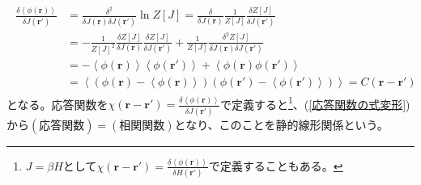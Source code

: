 \documentclass[a4paper,12pt, oneside, openany]{jsbook}
\begin{document}
\begin{eqnarray}
  \label{応答関数の式変形}
  \begin{split}
    \frac{\delta \left\langle \phi (\boldsymbol{r})\right\rangle}{\delta J(\boldsymbol{r}')}&= \frac{\delta ^2 }{\delta J(\boldsymbol{r}) \delta J(\boldsymbol{r}')} \ln Z\left[J\right] = \frac{\delta }{\delta J(\boldsymbol{r}) } \frac{1}{Z\left[J\right]} \frac{\delta Z\left[J\right]}{\delta J(\boldsymbol{r}')} \\
    &=-\frac{1}{Z\left[J\right]^2} \frac{\delta Z\left[J\right]}{\delta J(\boldsymbol{r})}\frac{\delta Z\left[J\right]}{\delta J(\boldsymbol{r}')}+ \frac{1}{Z\left[J\right]} \frac{\delta ^2 Z\left[J\right]}{\delta J(\boldsymbol{r}) \delta J(\boldsymbol{r}')}\\
    &=-\left\langle \phi (\boldsymbol{r})\right\rangle \left\langle \phi (\boldsymbol{r}')\right\rangle +\left\langle \phi (\boldsymbol{r})\phi (\boldsymbol{r}')\right\rangle \\
    &=\left\langle (\phi (\boldsymbol{r})-\left\langle \phi (\boldsymbol{r})\right\rangle)(\phi (\boldsymbol{r}')-\left\langle \phi (\boldsymbol{r}')\right\rangle)\right\rangle =C(\boldsymbol{r}-\boldsymbol{r}')
  \end{split}
\end{eqnarray}
となる。応答関数を$\chi (\boldsymbol{r}-\boldsymbol{r}')=\frac{\delta \left\langle \phi (\boldsymbol{r})\right\rangle}{\delta J(\boldsymbol{r}')}$で定義すると\footnote{$J=\beta H$として$\chi (\boldsymbol{r}-\boldsymbol{r}')=\frac{\delta \left\langle \phi (\boldsymbol{r})\right\rangle}{\delta H(\boldsymbol{r}')}$で定義することもある。}、(\ref{応答関数の式変形})から$(応答関数)=(相関関数)$となり、このことを静的線形関係という。
\end{document}
